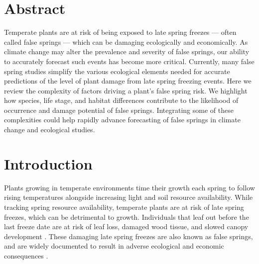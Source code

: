 \documentclass{article}\usepackage[]{graphicx}\usepackage[]{color}
\begin{document}
\section{Abstract}
Temperate plants are at risk of being exposed to late spring freezes --- often called false springs --- which can be damaging ecologically and economically. As climate change may alter the prevalence and severity of false springs, our ability to accurately forecast such events has become more critical. Currently, many false spring studies simplify the various ecological elements needed for accurate predictions of the level of plant damage from late spring freezing events. Here we review the complexity of factors driving a plant's false spring risk. We highlight how species, life stage, and habitat differences contribute to the likelihood of occurrence and damage potential of false springs. %
Integrating some of these complexities could help rapidly advance forecasting of false springs in climate change and ecological studies.

\section{Introduction}

Plants growing in temperate environments time their growth each spring to follow rising temperatures alongside increasing light and soil resource availability. While tracking spring resource availability, temperate plants are at risk of late spring freezes, which can be detrimental to growth. Individuals that leaf out before the last freeze date are at risk of leaf loss, damaged wood tissue, and slowed canopy development \citep{Gu2008, Hufkens2012}. These damaging late spring freezes are also known as false springs, and are widely documented to result in adverse ecological and economic consequences \citep{Knudson2012, Ault2013}.
\end{document}
